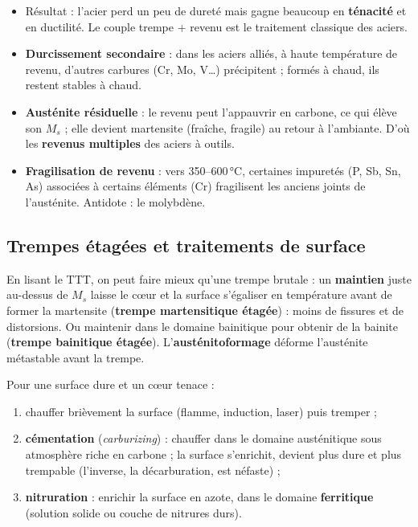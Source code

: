 \begin{propbox}[title={Le revenu : moins dur, mais surtout moins fragile}]
\begin{itemize}
  \item Résultat : l'acier perd un peu de dureté mais gagne beaucoup en \textbf{ténacité} et en
        ductilité. Le couple \og trempe + revenu\fg{} est le traitement classique des aciers.
  \item \textbf{Durcissement secondaire} : dans les aciers alliés, à haute température de
        revenu, d'autres carbures (Cr, Mo, V\ldots) précipitent ; formés à chaud, ils restent
        stables à chaud.
  \item \textbf{Austénite résiduelle} : le revenu peut l'appauvrir en carbone, ce qui élève son
        $M_s$ ; elle devient martensite (fraîche, fragile) au retour à l'ambiante. D'où les
        \textbf{revenus multiples} des aciers à outils.
  \item \textbf{Fragilisation de revenu} : vers 350--600\,°C, certaines impuretés (P, Sb, Sn, As)
        associées à certains éléments (Cr) fragilisent les anciens joints de l'austénite. Antidote :
        le molybdène.
\end{itemize}
\end{propbox}

\subsection*{Trempes étagées et traitements de surface}


En lisant le TTT, on peut faire mieux qu'une trempe brutale : un \textbf{maintien} juste
au-dessus de $M_s$ laisse le c\oe ur et la surface s'égaliser en température avant de former la
martensite (\textbf{trempe martensitique étagée}) : moins de fissures et de distorsions. Ou
maintenir dans le domaine bainitique pour obtenir de la bainite (\textbf{trempe bainitique
étagée}). L'\textbf{austénitoformage} déforme l'austénite métastable avant la trempe.

\begin{propbox}[title={Durcir seulement la surface}]
Pour une surface dure et un c\oe ur tenace :
\begin{enumerate}
  \item chauffer brièvement la surface (flamme, induction, laser) puis tremper ;
  \item \textbf{cémentation} (\emph{carburizing}) : chauffer dans le domaine austénitique sous
        atmosphère riche en carbone ; la surface s'enrichit, devient plus dure et plus
        trempable (l'inverse, la décarburation, est néfaste) ;
  \item \textbf{nitruration} : enrichir la surface en azote, dans le domaine \textbf{ferritique}
        (solution solide ou couche de nitrures durs).
\end{enumerate}
\end{propbox}

